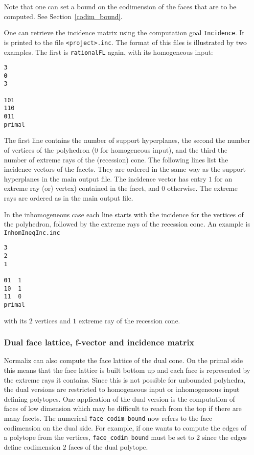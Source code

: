 \documentclass[12pt,a4paper]{scrartcl}
\theoremstyle{definition}
\begin{document}
Note that one can set a bound on the codimension of the faces that are to be computed. See Section~\ref{codim_bound}.

One can retrieve the incidence matrix using the computation goal \verb|Incidence|. It is printed to the file \verb|<project>.inc|. The format of this files is illustrated by two examples. The first is \verb|rationalFL| again, with its homogeneous input:
\begin{Verbatim}
3
0
3

101
110
011
primal
\end{Verbatim}
The first line contains the number of support hyperplanes, the second the number of vertices of the polyhedron ($0$ for homogeneous input), and the third the number of extreme rays of the (recession) cone. The following lines list the incidence vectors of the facets. They are ordered in the same way as the support hyperplanes in the main output file. The incidence vector has entry $1$ for an extreme ray (or) vertex) contained in the facet, and $0$ otherwise. The extreme rays are ordered as in the main output file.

In the inhomogeneous case each line starts with the incidence for the vertices of the polyhedron, followed by the extreme rays of the recession cone. An example is \verb|InhomIneqInc.inc|
\begin{Verbatim}
3
2
1

01  1
10  1
11  0
primal
\end{Verbatim}
with its $2$ vertices and $1$ extreme ray of the recession cone.

\subsubsection{Dual face lattice, f-vector and incidence matrix}

Normaliz can also compute the face lattice of the dual cone. On the primal side this means that the face lattice is built bottom up and each face is represented by the extreme rays it contains. Since this is not possible for unbounded polyhedra, the dual versions are restricted to homogeneous input or inhomogeneous input defining polytopes. One application of the dual version is the computation of faces of low dimension which may be difficult to reach from the top if there are many facets. The numerical \verb|face_codim_bound| now refers to the face codimension on the dual side. For example, if one wants to compute the edges of a polytope from the vertices, \verb|face_codim_bound| must be set to $2$ since the edges define codimension $2$ faces of the dual polytope.
\end{document}
